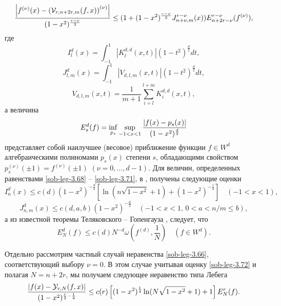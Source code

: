   \begin{equation}\label{sob-leg-3.67}
   {\left|f^{(\nu)}(x)-\left(\mathcal{V }_{r,n+2r,m}(f,x)\right)^{(\nu)}\right|\over(1-x^2)^\frac{r-\nu}{2}}
\le  (1+(1-x^2)^\frac{r-\nu}{2}J^{r-\nu}_{n+\nu,m}(x))
E^{r-\nu}_{n+2r-\nu}(f^{(\nu)}),
\end{equation}
где
\begin{equation}\label{sob-leg-3.68}
I^{d}_{l}(x)= \int_{-1}^{1}|K^{d,d}_{l}(x,t)|(1-t^2)^{\frac{d}{2}}dt,
\end{equation}
\begin{equation}\label{sob-leg-3.69}
J^{d}_{l,m}(x)= \int_{-1}^{1}|V_{d,l,m}(x,t)|(1-t^2)^{\frac{d}{2}}dt,
\end{equation}
\begin{equation}\label{sob-leg-3.70}
V_{d,l,m}(x,t)=\frac{1}{m+1}\sum_{i=l}^{l+m}K^{d,d}_i(x,t),
\end{equation}
а величина
\begin{equation}\label{sob-leg-3.71}
E_s^d(f)=\inf_{p_s}\sup_{-1<x<1}{|f(x)-p_s(x)|\over (1-x^2)^\frac{d}{2}}
\end{equation}
представляет собой наилучшее (весовое) приближение функции $f\in W^d$ алгебраическими полиномами $p_s(x)$ степени
$s$, обладающими свойством $p_s^{(\nu)}(\pm1)=f^{(\nu)}(\pm1)$ $(\nu=0,\ldots, d-1)$. Для величин, определенных равенствами \eqref{sob-leg-3.68} -- \eqref{sob-leg-3.71}, в \cite{Haar-Tcheb-Shar15}, \cite{sob-leg-Shar17} получены следующие оценки
\begin{equation}\label{sob-leg-3.72}
I^d_n(x)\le c(d)(1-x^2)^{-\frac{d}{2}}\left[\ln(n\sqrt{1-x^2}+1)+(1-x^2)^{-\frac14}\right]\quad(-1<x<1),
\end{equation}
\begin{equation}\label{sob-leg-3.73}
J^d_{n,m}(x)\le c(d,a,b)(1-x^2)^{-\frac{d}{2}}\quad (-1<x<1,\, 0< a<n/m\le b),
\end{equation}
а из известной теоремы Теляковского -- Гопенгауза \cite{sob-leg-TEL},\cite{sob-leg-GOP} следует, что
\begin{equation}\label{sob-leg-3.74}
E_N^d(f)\le c(d)N^{-d}\omega(f^{(d)},\frac{1}{N})\quad (f\in W^d).
\end{equation}

Отдельно рассмотрим частный случай неравенства \eqref{sob-leg-3.66}, соответствующий выбору $\nu=0$. В этом случае  учитывая оценку \eqref{sob-leg-3.72} и полагая $N=n+2r$, мы получаем следующее неравенство типа Лебега
\begin{equation}\label{sob-leg-3.75}
{\left|f(x)-\mathcal{Y}_{r,N}(f,x)\right|
\over(1-x^2)^{\frac{r}{2}-\frac14}}\le c(r)\left[(1-x^2)^{\frac14}\ln(N\sqrt{1-x^2}+1)+1\right]E^{r}_{N}(f).
  \end{equation}

